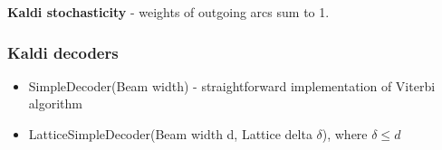 {\bf Kaldi stochasticity} - weights of outgoing arcs sum to 1.


\subsubsection*{Kaldi decoders} %
\begin{itemize}
    \item SimpleDecoder(Beam width) - straightforward implementation of Viterbi algorithm
    \item LatticeSimpleDecoder(Beam width d, Lattice delta $\delta$), where $ \delta \le d$

\end{itemize}



